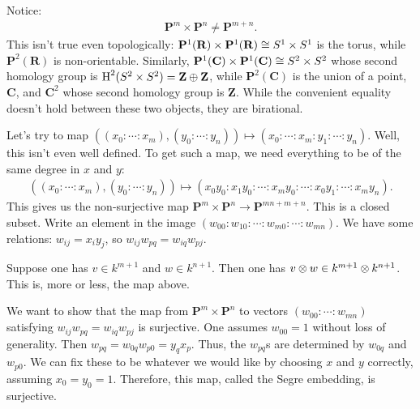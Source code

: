 \documentclass [11 pt, oneside, margin = 1 in] {article}
\begin{document}
Notice:
\begin{align*}
	\mathbf{P}^m \times \mathbf{P}^n\ne \mathbf{P}^{m+n}.
\end{align*}
This isn't true even topologically: $\mathbf{P}^1(\mathbf{R})\times \mathbf{P}^1(\mathbf{R})\cong S^1\times S^1$ is the torus, while $\mathbf{P}^2(\mathbf{R})$ is non-orientable. Similarly, $\mathbf{P}^1(\mathbf{C})\times \mathbf{P}^1(\mathbf{C})\cong S^2\times S^2$ whose second homology group is $\operatorname{H}^2(S^2\times S^2) =  \mathbf{Z}\oplus \mathbf{Z}$, while $\mathbf{P}^2(\mathbf{C})$ is the union of a point, $\mathbf{C}$, and $\mathbf{C}^2$ whose second homology group is $\mathbf{Z}$. While the convenient equality doesn't hold between these two objects, they are birational.

Let's try to map $((x_0:\cdots:x_m), (y_0:\cdots:y_n))\longmapsto (x_0:\cdots:x_m:y_1:\cdots:y_n)$. Well, this isn't even well defined. To get such a map, we need everything to be of the same degree in $x$ and $y$:
\begin{align*}
	((x_0:\cdots:x_m), (y_0:\cdots:y_n))\longmapsto (x_0y_0:x_1y_0:\cdots:x_my_0:\cdots: x_0y_1:\cdots:x_my_n).
\end{align*}
This gives us the non-surjective map $\mathbf{P}^m\times \mathbf{P}^n\longrightarrow \mathbf{P}^{mn+m+n}$. This is a closed subset. Write an element in the image $(w_{00}:w_{10}:\cdots: w_{m0} : \cdots: w_{mn})$. We have some relations: $w_{ij} = x_iy_j$, so $w_{ij}w_{pq}=w_{iq}w_{pj}$. 

Suppose one has $v\in k^{m+1}$ and $w\in k^{n+1}$. Then one has $v\otimes w \in k^{m+1}\otimes k^{n+1}$. This is, more or less, the map above.

We want to show that the map from $\mathbf{P}^m\times \mathbf{P}^n$ to vectors $(w_{00}:\cdots:w_{mn})$ satisfying $w_{ij}w_{pq}=w_{iq}w_{pj}$ is surjective. One assumes $w_{00}=1$ without loss of generality. Then $w_{pq} = w_{0q}w_{p0}=y_qx_p$. Thus, the $w_{pq}$s are determined by $ w_{0q}$ and $w_{p0}$. We can fix these to be whatever we would like by choosing $x$ and $y$ correctly, assuming $x_0=y_0=1$. Therefore, this map, called the Segre embedding, is surjective.
\end{document}
